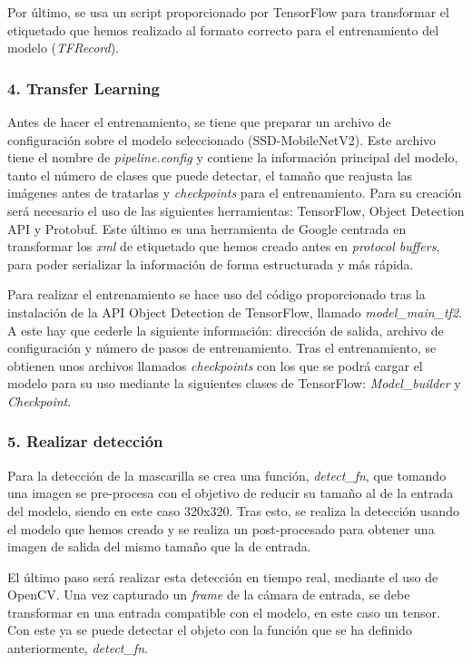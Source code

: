Por último, se usa un script proporcionado por TensorFlow para transformar el etiquetado que hemos realizado al formato correcto para el entrenamiento del modelo (\textit{TFRecord}).

\vspace{-0.5cm}
\subsubsection*{4. Transfer Learning}
\vspace{-0.7cm}
Antes de hacer el entrenamiento, se tiene que preparar un archivo de configuración sobre el modelo seleccionado (SSD-MobileNetV2). Este archivo tiene el nombre de \textit{pipeline.config} y contiene la información principal del modelo, tanto el número de clases que puede detectar, el tamaño que reajusta las imágenes antes de tratarlas y \textit{checkpoints} para el entrenamiento. Para su creación será necesario el uso de las siguientes herramientas: TensorFlow, Object Detection API y Protobuf. Este último es una herramienta de Google centrada en transformar los \textit{xml} de etiquetado que hemos creado antes en \textit{protocol buffers}, para poder serializar la información de forma estructurada y más rápida.

Para realizar el entrenamiento se hace uso del código proporcionado tras la instalación de la API Object Detection de TensorFlow, llamado \textit{model\_main\_tf2}. A este hay que cederle la siguiente información: dirección de salida, archivo de configuración y número de pasos de entrenamiento. Tras el entrenamiento, se obtienen unos archivos llamados \textit{checkpoints} con los que se podrá cargar el modelo para su uso mediante la siguientes clases de TensorFlow: \textit{Model\_builder} y \textit{Checkpoint}.

\vspace{-0.5cm}
\subsubsection*{5. Realizar detección}
\vspace{-0.7cm}
Para la detección de la mascarilla se crea una función, \textit{detect\_fn}, que tomando una imagen se pre-procesa con el objetivo de  reducir su tamaño al de la entrada del modelo, siendo en este caso 320x320. Tras esto, se realiza la detección usando el modelo que hemos creado y se realiza un post-procesado para obtener una imagen de salida del mismo tamaño que la de entrada.

El último paso será realizar esta detección en tiempo real, mediante el uso de OpenCV. Una vez capturado un \textit{frame} de la cámara de entrada, se debe transformar en una entrada compatible con el modelo, en este caso un tensor. Con este ya se puede detectar el objeto con la función que se ha definido anteriormente, \textit{detect\_fn}. 

